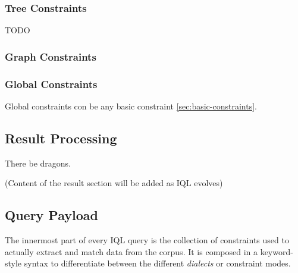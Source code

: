 \documentclass[11pt]{article}
\newcommand{\iql}{IQL\xspace}
\begin{document}
\subsubsection{Tree Constraints}
\label{sec:tree-constraints}

TODO

\subsubsection{Graph Constraints}
\label{sec:graph-constraints}


\subsubsection{Global Constraints}
\label{sec:global-constraints}

Global constraints con be any basic constraint \cref{sec:basic-constraints}.


\subsection{Result Processing}
\label{sec:result-processing}

There be dragons.

(Content of the result section will be added as \iql evolves)


\subsection{Query Payload}
\label{sec:query-payload}

The innermost part of every \iql query is the collection of constraints used to actually extract and match data from the corpus.
It is composed in a keyword-style syntax to differentiate between the different \textit{dialects} or constraint modes.
\end{document}
